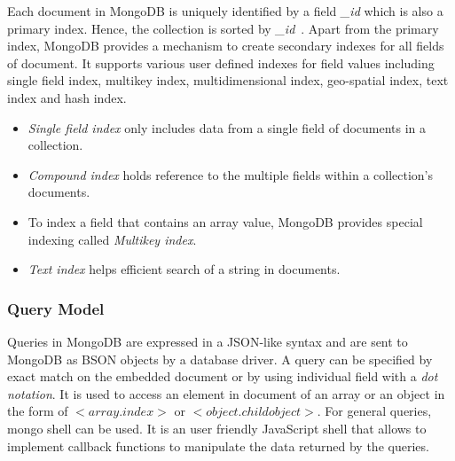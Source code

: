 Each document in MongoDB is uniquely identified by a field \textit{\_id} which is also a primary index. Hence, the collection is sorted by \textit{\_id}~\citep{nosql/comparision}.
Apart from the primary index, MongoDB provides a mechanism to create secondary indexes for all fields of document. It supports various user defined indexes for field values including single field index, multikey index, multidimensional index, geo-spatial index, text index and hash index.
\begin{itemize}
\item \textit{Single field index} only includes data from a single field of documents in a collection. 
\item \textit{Compound index} holds reference to the multiple fields within a collection's documents.
\item To index a field that contains an array value, MongoDB provides special indexing called \textit{Multikey index}.
\item \textit{Text index} helps efficient search of a string in documents.
\end{itemize}
\subsubsection{Query Model}\label{mongo-query-model}

Queries in MongoDB are expressed in a JSON-like syntax and are sent to MongoDB as BSON objects by a database driver\citep{orend2010analysis}. A query can be specified by exact match on the embedded document or by using individual field with a \textit{dot notation}. It is used to access an element in document of an array or an object in the form of  $<$$array$.$index$$>$ or  $<$$object$.$childobject$$>$. For general queries, mongo shell can be used. It is an user friendly JavaScript shell that allows to implement callback functions to manipulate the data returned by the queries.  

